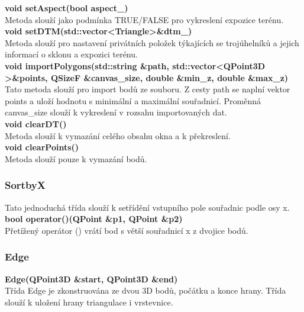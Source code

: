 \documentclass[a4paper,11pt,twoside]{article}
\begin{document}
\noindent\textbf{void setAspect(bool aspect\_)}\\
Metoda slouží jako podmínka TRUE/FALSE pro vykreslení expozice terénu.\\

\noindent\textbf{void setDTM(std::vector\textless Triangle\textgreater \&dtm\_)}\\
Metoda slouží pro  nastavení privátních položek týkajících se trojúhelníků a jejich informací o sklonu a expozici terénu.\\

\noindent\textbf{void importPolygons(std::string \&path, std::vector\textless QPoint3D \textgreater \&points,  QSizeF \&canvas\_size, double \&min\_z, double \&max\_z)}\\
Tato metoda slouží pro import bodů ze souboru. Z cesty path se naplní vektor points a uloží hodnotu s minimální a maximální souřadnicí. Proměnná canvas\_size slouží k vykreslení v rozsahu importovaných dat.\\

\noindent\textbf{void clearDT()}\\
Metoda slouží k vymazání celého obsahu okna a k překreslení.\\

\noindent\textbf{void clearPoints()}\\
Metoda slouží pouze k vymazání bodů.\\

\subsubsection{SortbyX}

Tato jednoduchá třída slouží k setřídění vstupního pole souřadnic podle osy x.\\

\noindent\textbf{bool operator()(QPoint \&p1, QPoint \&p2)}\\
Přetížený operátor () vrátí bod s větší souřadnicí x z dvojice bodů.\\

\newpage
\vspace*{-1cm}
\subsubsection{Edge}

\noindent\textbf{Edge(QPoint3D \&start, QPoint3D \&end)}\\
Třída Edge je zkonstruována ze dvou 3D bodů, počátku a konce hrany. Třída slouží k uložení hrany triangulace i vrstevnice.\\
    
\end{document}
